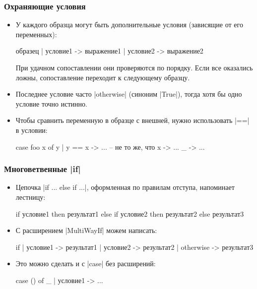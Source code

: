 \documentclass[10pt]{beamer}
\begin{document}
\begin{frame}[fragile]
  \frametitle{Охраняющие условия}
  \begin{itemize}
    \item У каждого образца могут быть дополнительные условия (зависящие от его переменных):
          \begin{haskell}
            образец
                | условие1 -> выражение1 
                | условие2 -> выражение2
          \end{haskell}
          При удачном сопоставлении они проверяются по порядку. Если все оказались ложны, сопоставление переходит к следующему образцу.
    \item Последнее условие часто \haskinline|otherwise| (синоним \haskinline|True|), тогда хотя бы одно условие точно истинно.
    \item Чтобы сравнить переменную в образце с внешней, нужно использовать \haskinline|==| в условии:
          \begin{haskell}
            case foo x of
                y | y == x -> ... -- не то же, что x -> ...
                _ -> ...
          \end{haskell}
  \end{itemize}
\end{frame}

\begin{frame}[fragile]
  \frametitle{Многоветвенные \haskinline|if|}
    \begin{itemize}
      \item Цепочка \haskinline|if ... else if ...|, оформленная по правилам отступа, напоминает лестницу:
            \begin{haskell}
              if условие1
                  then результат1
                  else if условие2
                      then результат2
                      else результат3
            \end{haskell}
    \item С расширением \haskinline|MultiWayIf| можем написать:
          \begin{haskell}
            if | условие1 -> результат1
               | условие2 -> результат2
               | otherwise -> результат3
          \end{haskell}
    \item Это можно сделать и с \haskinline|case| без расширений:  \pause
          \begin{haskell}
            case () of _ | условие1 -> ...
          \end{haskell}
    \end{itemize}
\end{frame}
\end{document}
